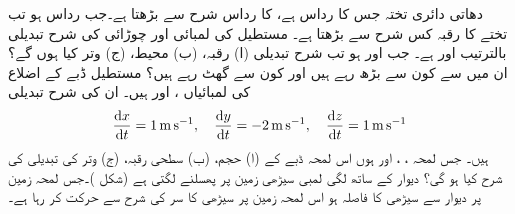 دھاتی دائری تختہ جس کا رداس  ہے،  کا رداس   شرح سے بڑھتا ہے۔جب رداس 
 ہو تب تختے کا رقبہ کس شرح سے بڑھتا ہے۔
مستطیل کی لمبائی  اور چوڑائی  کی شرح تبدیلی  بالترتیب  اور  ہے۔ جب  اور  ہو تب شرح تبدیلی (ا) رقبہ، (ب) محیط، (ج) وتر کیا ہوں گے؟ ان میں سے کون سے بڑھ رہے ہیں اور کون سے گھٹ رہے ہیں؟ 
مستطیل ڈبے کے اضلاع  کی لمبائیاں ،  اور  ہیں۔ ان کی شرح تبدیلی
\begin{align*}
\frac{\dif x}{\dif t}=\SI{1}{\meter\per\second},\quad \frac{\dif y}{\dif t}=\SI{-2}{\meter\per\second},\quad \frac{\dif z}{\dif t}=\SI{1}{\meter\per\second}
\end{align*}
ہیں۔ جس لمحہ ، ، اور  ہوں اس لمحہ ڈبے کے (ا) حجم، (ب) سطحی رقبہ، (ج) وتر  کی تبدیلی کی شرح کیا ہو گی؟ 
دیوار کے ساتھ لگی  لمبی  سیڑھی زمین پر پھسلنے  لگتی ہے (شکل )۔جس لمحہ زمین پر دیوار سے سیڑھی کا فاصلہ  ہو اس لمحہ  زمین پر  سیڑھی کا  سر  کی  شرح سے حرکت کر رہا ہے۔
